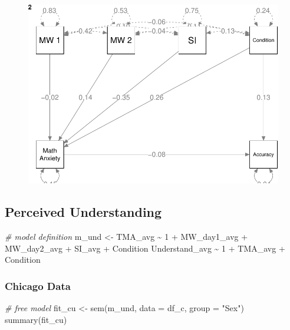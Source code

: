 \documentclass[
  letterpaper,
  DIV=11,
  numbers=noendperiod]{scrartcl}
\newenvironment{Shaded}{\begin{snugshade}}{\end{snugshade}}
\newcommand{\AttributeTok}[1]{\textcolor[rgb]{0.49,0.56,0.16}{#1}}
\newcommand{\CommentTok}[1]{\textcolor[rgb]{0.38,0.63,0.69}{\textit{#1}}}
\newcommand{\FunctionTok}[1]{\textcolor[rgb]{0.02,0.16,0.49}{#1}}
\newcommand{\NormalTok}[1]{\textcolor[rgb]{0.00,0.44,0.13}{#1}}
\newcommand{\OtherTok}[1]{\textcolor[rgb]{0.00,0.44,0.13}{#1}}
\newcommand{\StringTok}[1]{\textcolor[rgb]{0.25,0.44,0.63}{#1}}
\begin{document}
\begin{figure}[H]

{\centering \includegraphics{sampling_files/figure-pdf/unnamed-chunk-33-4.pdf}

}

\end{figure}

\hypertarget{perceived-understanding-1}{%
\subsection{Perceived Understanding}\label{perceived-understanding-1}}

\begin{Shaded}
\begin{Highlighting}[]
\CommentTok{\# model definition}
\NormalTok{m\_und }\OtherTok{\textless{}{-}} \StringTok{\textquotesingle{}}
\StringTok{  TMA\_avg \textasciitilde{} 1 + MW\_day1\_avg + MW\_day2\_avg + SI\_avg + Condition}
\StringTok{  Understand\_avg \textasciitilde{} 1 + TMA\_avg + Condition}
\StringTok{\textquotesingle{}}
\end{Highlighting}
\end{Shaded}

\hypertarget{chicago-data-1}{%
\subsubsection{Chicago Data}\label{chicago-data-1}}

\begin{Shaded}
\begin{Highlighting}[]
\CommentTok{\# free model}
\NormalTok{fit\_cu }\OtherTok{\textless{}{-}} \FunctionTok{sem}\NormalTok{(m\_und, }\AttributeTok{data =}\NormalTok{ df\_c, }\AttributeTok{group =} \StringTok{"Sex"}\NormalTok{)}
\FunctionTok{summary}\NormalTok{(fit\_cu)}
\end{Highlighting}
\end{Shaded}
\end{document}
